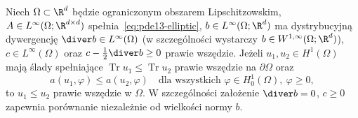 \begin{twierdzenie}
\label{thm:pde13-drift-comparison}
Niech $\Omega\subset\R^d$ będzie ograniczonym obszarem
Lipschitzowskim, $A\in L^\infty(\Omega;\R^{d\times d})$
spełnia~\eqref{eq:pde13-elliptic},
$b\in L^\infty(\Omega;\R^d)$ ma dystrybucyjną dywergencję
$\diver b\in L^\infty(\Omega)$ (w szczególności wystarczy
$b\in W^{1,\infty}(\Omega;\R^d)$),
$c\in L^\infty(\Omega)$ oraz
$c-\frac12\diver b\ge0$ prawie wszędzie. Jeżeli
$u_1,u_2\in H^1(\Omega)$ mają ślady spełniające
$\operatorname{Tr}u_1\le\operatorname{Tr}u_2$ prawie wszędzie
na $\partial\Omega$ oraz
\[
 a(u_1,\varphi)\le a(u_2,\varphi)
 \quad\text{dla wszystkich }\varphi\in H_0^1(\Omega),\ \varphi\ge0,
\]
to $u_1\le u_2$ prawie wszędzie w $\Omega$.
W szczególności założenie $\diver b=0$, $c\ge0$ zapewnia
porównanie niezależnie od wielkości normy $b$.
\end{twierdzenie}
